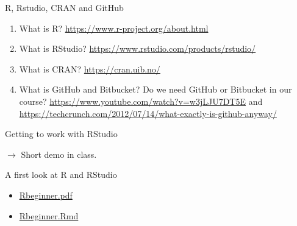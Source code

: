 \documentclass[10pt,ignorenonframetext,]{beamer}
\providecommand{\tightlist}{%
  \setlength{\itemsep}{0pt}\setlength{\parskip}{0pt}}
\begin{document}
\begin{frame}

\begin{block}{R, Rstudio, CRAN and GitHub}

\vspace{2mm}

\begin{enumerate}
\def\labelenumi{\arabic{enumi})}
\item
  What is R? \url{https://www.r-project.org/about.html} \vspace{2mm}
\item
  What is RStudio? \url{https://www.rstudio.com/products/rstudio/}
  \vspace{2mm}
\item
  What is CRAN? \url{https://cran.uib.no/} \vspace{2mm}
\item
  What is GitHub and Bitbucket? Do we need GitHub or Bitbucket in our
  course? \url{https://www.youtube.com/watch?v=w3jLJU7DT5E} and
  \url{https://techcrunch.com/2012/07/14/what-exactly-is-github-anyway/}
\end{enumerate}

\end{block}

\end{frame}

\begin{frame}

\begin{block}{Getting to work with RStudio}

\vspace{6mm}

\(\rightarrow\) Short demo in class.

\end{block}

\end{frame}

\begin{frame}

\begin{block}{A first look at R and RStudio}

\vspace{6mm}

\begin{itemize}
\tightlist
\item
  \href{https://github.com/stefaniemuff/statlearning/blob/master/1Intro/Rbeginner.pdf}{Rbeginner.pdf}
\item
  \href{https://github.com/stefaniemuff/statlearning/blob/master/1Intro/Rbeginner.Rmd}{Rbeginner.Rmd}
\end{itemize}

\end{block}

\end{frame}
\end{document}
